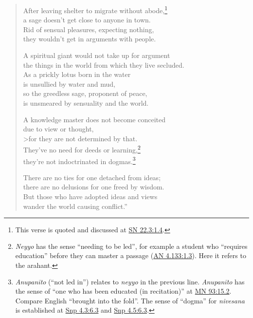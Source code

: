 \documentclass[12pt,openany]{book}%
\begin{document}
\begin{verse}
After leaving shelter to migrate without abode,\footnote{This verse is quoted and discussed at \href{https://suttacentral.net/sn22.3/en/sujato\#1.4}{SN 22.3:1.4}. } \\
a sage doesn’t get close to anyone in town. \\
Rid of sensual pleasures, expecting nothing, \\
they wouldn’t get in arguments with people. 

A spiritual giant would not take up for argument \\
the things in the world from which they live secluded. \\
As a prickly lotus born in the water \\
is unsullied by water and mud, \\
so the greedless sage, proponent of peace, \\
is unsmeared by sensuality and the world. 

A knowledge master does not become conceited \\
due to view or thought, \\>for they are not determined by that. \\
They’ve no need for deeds or learning,\footnote{\textit{Neyyo} has the sense “needing to be led”, for example a student who “requires education” before they can master a passage (\href{https://suttacentral.net/an4.133/en/sujato\#1.3}{AN 4.133:1.3}). Here it refers to the arahant. } \\
they’re not indoctrinated in dogmas.\footnote{\textit{\textsanskrit{Anupanīto}} (“not led in”) relates to \textit{neyyo} in the previous line. \textit{\textsanskrit{Anupanīto}} has the sense of “one who has been educated (in recitation)” at \href{https://suttacentral.net/mn93/en/sujato\#15.2}{MN 93:15.2}. Compare English “brought into the fold”. The sense of “dogma” for \textit{nivesana} is established at \href{https://suttacentral.net/snp4.3/en/sujato\#6.3}{Snp 4.3:6.3} and \href{https://suttacentral.net/snp4.5/en/sujato\#6.3}{Snp 4.5:6.3}. } 

There are no ties for one detached from ideas; \\
there are no delusions for one freed by wisdom. \\
But those who have adopted ideas and views \\
wander the world causing conflict.” 

%
\end{verse}
\end{document}
